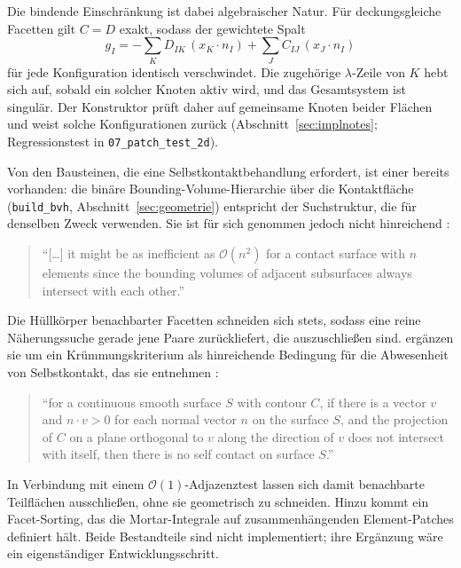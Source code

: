 \documentclass[a4paper,11pt]{article}
\def\bm#1{#1}%
\def\tilde#1{#1}%
\newcommand{\code}[1]{\texttt{\small #1}}
\newcommand{\file}[1]{\texttt{\small #1}}
\begin{document}
Die bindende Einschränkung ist dabei algebraischer Natur. Für deckungsgleiche Facetten gilt
$\bm C=\bm D$ exakt, sodass der gewichtete Spalt
\begin{equation*}
\tilde g_I = -\sum_K D_{IK}\,(\bm x_K\!\cdot\!\bm n_I) + \sum_J C_{IJ}\,(\bm x_J\!\cdot\!\bm n_I)
\end{equation*}
für jede Konfiguration identisch verschwindet. Die zugehörige $\lambda$-Zeile von $\bm K$ hebt sich
auf, sobald ein solcher Knoten aktiv wird, und das Gesamtsystem ist singulär. Der Konstruktor prüft
daher auf gemeinsame Knoten beider Flächen und weist solche Konfigurationen zurück
(Abschnitt~\ref{sec:implnotes}; Regressionstest in \file{07\_patch\_test\_2d}).

Von den Bausteinen, die eine Selbstkontaktbehandlung erfordert, ist einer bereits vorhanden: die
binäre Bounding-Volume-Hierarchie über die Kontaktfläche (\code{build\_bvh},
Abschnitt~\ref{sec:geometrie}) entspricht der Suchstruktur, die \citet{yang2008} für denselben
Zweck verwenden. Sie ist für sich genommen jedoch nicht hinreichend
\citep[S.~764]{yang2008}:

\begin{quote}
\small ``[\ldots] it might be as inefficient as $\mathcal{O}(n^2)$ for a contact surface with $n$
elements since the bounding volumes of adjacent subsurfaces always intersect with each other.''
\end{quote}

\noindent Die Hüllkörper benachbarter Facetten schneiden sich stets, sodass eine reine
Näherungssuche gerade jene Paare zurückliefert, die auszuschließen sind. \citet{yang2008} ergänzen
sie um ein Krümmungskriterium als hinreichende Bedingung für die Abwesenheit von Selbstkontakt,
das sie \citet{volino2000} entnehmen \citep[S.~764]{yang2008}:

\begin{quote}
\small ``for a continuous smooth surface $S$ with contour $C$, if there is a vector $\bm v$ and
$\bm n\cdot\bm v>0$ for each normal vector $\bm n$ on the surface $S$, and the projection of $C$ on
a plane orthogonal to $\bm v$ along the direction of $\bm v$ does not intersect with itself, then
there is no self contact on surface $S$.''
\end{quote}

\noindent In Verbindung mit einem $\mathcal{O}(1)$-Adjazenztest lassen sich damit benachbarte
Teilflächen ausschließen, ohne sie geometrisch zu schneiden. Hinzu kommt ein Facet-Sorting, das die
Mortar-Integrale auf zusammenhängenden Element-Patches definiert hält. Beide Bestandteile sind
nicht implementiert; ihre Ergänzung wäre ein eigenständiger Entwicklungsschritt.
\end{document}
